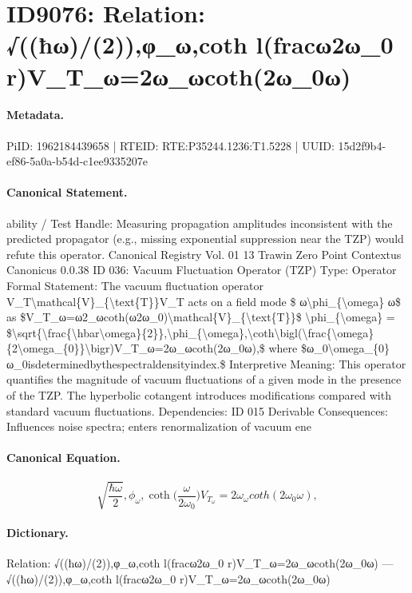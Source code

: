 \section*{ID9076: Relation: √((ħω)/(2)),φ\_ω,coth l(fracω2ω\_0 r)V\_T\_ω=2ω\_ωcoth(2ω\_0ω)}
\paragraph{Metadata.}
PiID: 1962184439658 | RTEID: RTE:P35244.1236:T1.5228 | UUID: 15d2f9b4-ef86-5a0a-b54d-c1ee9335207e

\paragraph{Canonical Statement.}
ability / Test Handle: Measuring propagation amplitudes inconsistent with the predicted propagator (e.g., missing exponential suppression near the TZP) would refute this operator. Canonical Registry Vol. 01 13 Trawin Zero Point Contextus Canonicus 0.0.38 ID 036: Vacuum Fluctuation Operator (TZP) Type: Operator Formal Statement: The vacuum fluctuation operator V\_T\textbackslash{}mathcal\{V\}\_\{\textbackslash{}text\{T\}\}V\_T acts on a field mode \$ ω\textbackslash{}phi\_\{\textbackslash{}omega\} ω\$ as \$V\_T\_ω=ω2\_ωcoth(ω2ω\_0)\textbackslash{}mathcal\{V\}\_\{\textbackslash{}text\{T\}\}\$ \textbackslash{}phi\_\{\textbackslash{}omega\} = \$\textbackslash{}sqrt\{\textbackslash{}frac\{\textbackslash{}hbar\textbackslash{}omega\}\{2\}\},\textbackslash{}phi\_\{\textbackslash{}omega\},\textbackslash{}coth\textbackslash{}bigl(\textbackslash{}frac\{\textbackslash{}omega\}\{2\textbackslash{}omega\_\{0\}\}\textbackslash{}bigr)V\_T\_ω=2ω\_ωcoth(2ω\_0ω),\$ where \$ω\_0\textbackslash{}omega\_\{0\}ω\_0isdeterminedbythespectraldensityindex.\$ Interpretive Meaning: This operator quantifies the magnitude of vacuum fluctuations of a given mode in the presence of the TZP. The hyperbolic cotangent introduces modifications compared with standard vacuum fluctuations. Dependencies: ID 015 Derivable Consequences: Influences noise spectra; enters renormalization of vacuum ene

\paragraph{Canonical Equation.}
\[
\sqrt{\frac{\hbar\omega}{2}},\phi_{\omega},\coth\bigl(\frac{\omega}{2\omega_{0}}\bigr)V_T_ω=2ω_ωcoth(2ω_0ω),
\]

\paragraph{Dictionary.}
Relation: √((ħω)/(2)),φ\_ω,coth l(fracω2ω\_0 r)V\_T\_ω=2ω\_ωcoth(2ω\_0ω) — √((ħω)/(2)),φ\_ω,coth l(fracω2ω\_0 r)V\_T\_ω=2ω\_ωcoth(2ω\_0ω)

